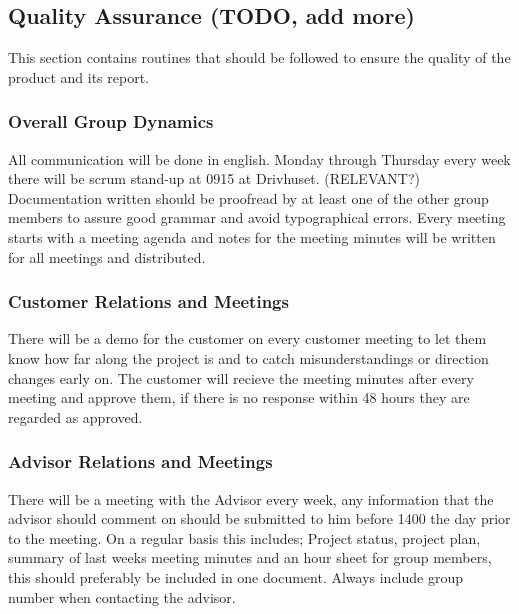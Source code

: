 \subsection{Quality Assurance (TODO, add more)}

This section contains routines that should be followed to ensure the 
quality of the product and its report.

\subsubsection{Overall Group Dynamics}

All communication will be done in english.
Monday through Thursday every week there will be scrum stand-up at 0915 at Drivhuset. (RELEVANT?)
Documentation written should be proofread by at least one of the other group members 
to assure good grammar and avoid typographical errors.
Every meeting starts with a meeting agenda and notes for the meeting minutes will be
written for all meetings and distributed.

\subsubsection{Customer Relations and Meetings}

There will be a demo for the customer on every customer meeting to let them
know how far along the project is and to catch misunderstandings or direction changes early on.
The customer will recieve the meeting minutes after every meeting and approve them, 
if there is no response within 48 hours they are regarded as approved.

\subsubsection{Advisor Relations and Meetings}

There will be a meeting with the Advisor every week, any information that the advisor
should comment on should be submitted to him before 1400 the day prior to the meeting.
On a regular basis this includes; Project status, project plan, summary of last weeks
meeting minutes and an hour sheet for group members, this should preferably be included in one document.
Always include group number when contacting the advisor.
